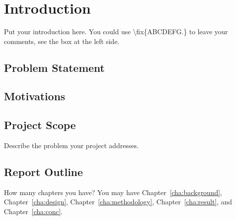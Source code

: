 \chapter{Introduction}
\label{cha:intro}

Put your introduction here. You could use \textbackslash fix\{ABCDEFG.\}
to leave your comments, see the box at the left side.



\section{Problem Statement}
\label{sec:problemstatement}



\section{Motivations}
\label{sec:motivations}


\section{Project Scope}
\label{sec:projectscope}
Describe the problem your project addresses.


\section{Report Outline}
\label{sec:outline}

How many chapters you have? You may have Chapter~\ref{cha:background},
Chapter~\ref{cha:design}, Chapter~\ref{cha:methodology},
Chapter~\ref{cha:result}, and Chapter~\ref{cha:conc}.
